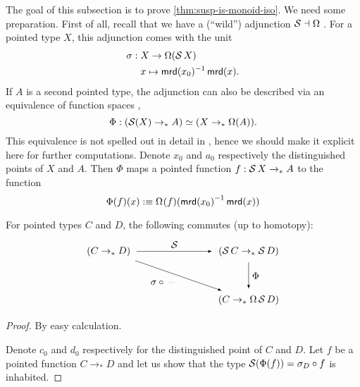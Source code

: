 \documentclass[english,a4]{article}
\newcommand{\ptdto}{\to_\ast}%
\begin{document}
The goal of this subsection is to prove \cref{thm:susp-is-monoid-iso}.
We need some preparation.
First of all, recall that we have a (``wild'') adjunction $\operatorname{\mathcal S} \dashv \Omega$ \cite[find lemma]{HoTT}.
For a pointed type $X$, this adjunction comes with the unit
\begin{align}
\sigma : \; &X \to \Omega(\operatorname{\mathcal S} X) \label{eq:sigma} \\
&x \mapsto \operatorname{\mathsf{mrd}}(x_0)^{-1} \operatorname{\mathsf{mrd}}(x).
\end{align}
If $A$ is a second pointed type, the adjunction can also be described via an equivalence of function spaces \cite[Lemma 6.5.4]{HoTT},
\begin{equation}\label{eq:adj-equivalence-susp-loopspace}
\Phi : (\operatorname{\mathcal S}(X) \to_* A) \simeq (X \to_* \Omega(A)).
\end{equation}
This equivalence is not spelled out in detail in \cite[Lemma 6.5.4]{HoTT}, hence we
should make it explicit here for further computations. Denote $x_0$ and $a_0$ respectively the distinguished points of $X$ and $A$. Then $\Phi$ maps a pointed function $f:\susp X \ptdto A$ to the function
\begin{displaymath}
  \Phi(f) (x) \defequi \loopspace \null (f)(\inv{\mrd (x_0)} \mrd(x))
\end{displaymath}

\begin{lemma} \label{lem:adj-prop}
    For pointed types $C$ and $D$, the following commutes (up to homotopy):
    \begin{equation}
    \begin{tikzpicture}[x=5cm,y=-1.75cm,baseline=(current bounding box.center)]
    \tikzset{arrow/.style={shorten >=0.1cm,shorten <=.1cm,-latex}}
    \node (A) at (0,0) {$(C \to_* D)$}; 
    \node (D) at (1,0) {$(\susp C \to_* \susp D)$}; 
    \node (C) at (1,1) {$(C \to_* \Omega \susp D)$}; 
    
    \draw[arrow] (A) to node [above] {$\susp$} (D);
    \draw[arrow] (A) to node [below left] {$\sigma \circ \, \blank$} (C);
    \draw[arrow] (D) to node [right] {$\Phi$} (C);
    \end{tikzpicture}
    \end{equation}
\end{lemma}
\begin{proof}
    By easy calculation.

  Denote $c_0$ and $d_0$ respectively for the distinguished point of $C$ and $D$.
  Let $f$ be a pointed function $C \ptdto D$ and let us show that the type
  $\operatorname{\mathcal S} (\Phi (f)) = \sigma_D \circ f$ is inhabited.
\end{proof}
\end{document}
